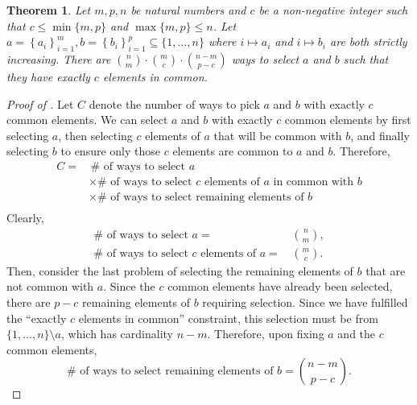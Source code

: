 \documentclass[12pt]{article}
\numberwithin{equation}{section}
\theoremstyle{definition}
\theoremstyle{plain}
\newtheorem{theorem}{Theorem}[section]
\begin{document}
\begin{theorem}
\label{thm--picking-with-common-elements}
Let \(m, p, n\) be natural numbers and \(c\) be a non-negative integer such
that \(c \leq \min \{m, p\}\) and \(\max \{m, p\} \leq n\).
Let \(a = \left\{ a_{i} \right\}_{i = 1}^{m}, b = \left\{ b_{i} \right\}_{i =
1}^{p} \subseteq \{1, \dots, n\}\) where \(i \mapsto a_{i}\) and \(i \mapsto
b_{i}\) are both strictly increasing.
There are \(\binom{n}{m} \cdot \binom{m}{c} \cdot \binom{n - m}{p - c}\)
ways to select \(a\) and \(b\) such that they have exactly \(c\) elements in
common.
\end{theorem}

\begin{proof}[Proof of ]
Let \(C\) denote the number of ways to pick \(a\) and \(b\) with exactly \(c\)
common elements.
We can select \(a\) and \(b\) with exactly \(c\) common elements by first
selecting \(a\), then selecting \(c\) elements of \(a\) that will be common with
\(b\), and finally selecting \(b\) to ensure only those \(c\) elements are
common to \(a\) and \(b\).
Therefore,
\begin{equation*}
  \begin{split}
    C =
    & \, \# \text{ of ways to select } a \\
    & \times \# \text{ of ways to select } c \text{ elements of } a \text{ in
    common with } b \\
    & \times \# \text{ of ways to select remaining elements of } b \\
  \end{split}
\end{equation*}
Clearly,
\begin{align*}
  \# \text{ of ways to select } a =
  & \, \binom{n}{m}, \\
  \# \text{ of ways to select } c \text{ elements of } a =
  & \, \binom{m}{c}.
\end{align*}
Then, consider the last problem of selecting the remaining elements of \(b\)
that are not common with \(a\).
Since the \(c\) common elements have already been selected, there are \(p - c\)
remaining elements of \(b\) requiring selection.
Since we have fulfilled the ``exactly \(c\) elements in common''
constraint, this selection must be from \(\{1, \dots, n\} \setminus a\), which
has cardinality \(n - m\).
Therefore, upon fixing \(a\) and the \(c\) common elements,
\begin{equation*}
  \# \text{ of ways to select remaining elements of } b = \binom{n - m}{p - c}.
\end{equation*}
\end{proof}
\end{document}
